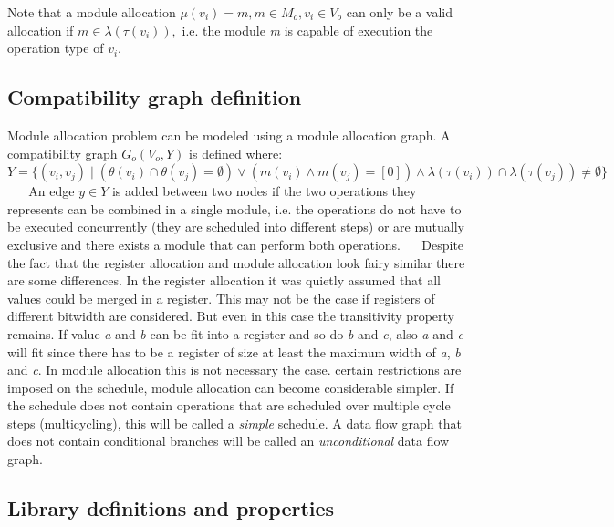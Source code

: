 Note that a module allocation $\mu (v_i)=m, m\in M_o, v_i\in V_o$ can only be a valid allocation if $m\in \lambda (\tau (v_i)),$ i.\+e. the module {\itshape m} is capable of execution the operation type of $v_i$.\hypertarget{src_HLS_module_binding_page_comp_graph}{}\subsection{Compatibility graph definition}\label{src_HLS_module_binding_page_comp_graph}
Module allocation problem can be modeled using a module allocation graph. A compatibility graph $G_o(V_o,Y)$ is defined where\+:~\newline
~\newline
 $Y={ \lbrace (v_i,v_j)\mid (\theta (v_i)\cap \theta (v_j)=\emptyset )\vee (m(v_i) \wedge m(v_j)=[0])\wedge \lambda (\tau (v_i)) \cap \lambda (\tau (v_j)) \neq \emptyset \rbrace } $~\newline
~\newline
 An edge $ y\in Y$ is added between two nodes if the two operations they represents can be combined in a single module, i.\+e. the operations do not have to be executed concurrently (they are scheduled into different steps) or are mutually exclusive and there exists a module that can perform both operations.~\newline
 ~\newline
 Despite the fact that the register allocation and module allocation look fairy similar there are some differences. In the register allocation it was quietly assumed that all values could be merged in a register. This may not be the case if registers of different bitwidth are considered. But even in this case the transitivity property remains. If value {\itshape a} and {\itshape b} can be fit into a register and so do {\itshape b} and {\itshape c}, also {\itshape a} and {\itshape c} will fit since there has to be a register of size at least the maximum width of {\itshape a}, {\itshape b} and {\itshape c}. In module allocation this is not necessary the case.  certain restrictions are imposed on the schedule, module allocation can become considerable simpler. If the schedule does not contain operations that are scheduled over multiple cycle steps (multicycling), this will be called a {\itshape simple} schedule. A data flow graph that does not contain conditional branches will be called an {\itshape unconditional} data flow graph.\hypertarget{src_HLS_module_binding_page_library}{}\subsection{Library definitions and properties}\label{src_HLS_module_binding_page_library}
